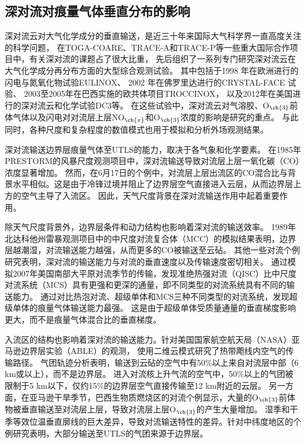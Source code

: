 \subsection{深对流对痕量气体垂直分布的影响}

深对流云对大气化学成分的垂直输送，是近三十年来国际大气科学界一直高度关注的科学问题，
在TOGA-COARE\citep{Webster.1992}、TRACE-A\citep{Fishman.1996}和TRACE-P\citep{Jacob.2003}等一些重大国际合作项目中，有关深对流的课题占了很大比重，
先后组织了一系列专门研究深对流云在大气化学成分再分布方面的大型综合观测试验。
其中包括于1998 年在欧洲进行的闪电与氮氧化物试验EULINOX\citep{Holler.2000}、
2002 年在佛罗里达进行的CRYSTAL-FACE 试验\citep{Toon.2003}、
2003至2005年在巴西实施的欧共体项目TROCCINOX\citep{Huntrieser.2008}，
以及2012年在美国进行的深对流云和化学试验DC3\citep{Barth.2019}等。
在这些试验中，深对流云对气溶胶、O$_{\ch{3}}$前体气体以及闪电对对流层上层NO$_{\ch{x}}$和O$_{\ch{3}}$浓度的影响是研究的重点。
与此同时，各种尺度和复杂程度的数值模式也用于模拟和分析外场观测结果。

深对流输送边界层痕量气体至UTLS的能力，取决于各气象和化学要素。
在1985年PRESTORM的风暴尺度观测项目中，深对流输送导致对流层上层一氧化碳（CO）浓度显著增加\citep{Dickerson.1987,Pickering.1989}。
然而，在6月17日的个例中，对流层上层出流区的CO混合比与背景水平相似。这是由于冷锋过境并阻止了边界层空气直接进入云层，从而边界层上方的空气主导了入流区\citep{Pickering.1988}。
因此，天气尺度背景在深对流输送作用中起着重要作用。

除天气尺度背景外，边界层条件和动力结构也影响着深对流的输送效率。
1989年北达科他州雷暴观测项目中的中尺度对流复合体（MCC）的模拟结果表明，边界层越潮湿，对流输送能力越强，从而更多的CO被输送至云砧\citep{Stenchikov.1996}。
其他一些对流个例研究表明，深对流的输送能力与对流的垂直速度以及传输速度密切相关\citep{Pickering.1992a,Wang.1996}。
\citet{Bigelbach.2014}通过模拟2007年美国南部大平原对流季节的传输，发现准绝热强对流（QISC）比中尺度对流系统（MCS）具有更强和更深的通量，即不同类型的对流系统具有不同的输送能力。
\citet{Li.2017b}通过对比热泡对流、超级单体和MCS三种不同类型的对流系统，发现超级单体的痕量气体输送能力最强。
这是由于超级单体受质量通量的垂直梯度影响更大，而不是痕量气体混合比的垂直梯度。

入流区的结构也影响着深对流的输送能力。针对美国国家航空航天局（NASA）亚马逊边界层实验（ABLE）的观测，
\citet{Scala.1990}使用二维云模式研究了热带飑线内空气的传输路径。
气团轨迹分析表明，输送到云砧的空气中有50\%以上来自对流层中部（6 km或以上），而不是边界层。
进入对流核上升气流的空气中，50\%以上的气团被限制于5 km以下，仅约15\%的边界层空气直接传输至12 km附近的云层。
另一方面，在亚马逊干旱季节，巴西生物质燃烧区的对流个例显示，大量的O$_{\ch{3}}$前体物被垂直输送至对流层上层，导致对流层上层O$_{\ch{3}}$的产生大量增加\citep{Pickering.1992,Pickering.1992a,Pickering.1996}。
湿季和干季等效位温垂直廓线的巨大差异，导致对流输送特性的差异。针对中纬度地区的个例研究表明，大部分输送至UTLS的气团来源于边界层\citep{Mullendore.2005,Skamarock.2000}。

